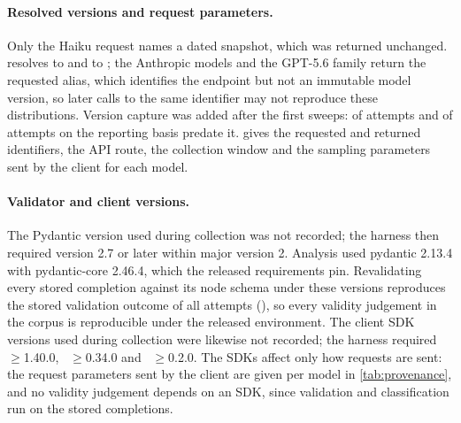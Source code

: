 \paragraph{Resolved versions and request parameters.}
Only the Haiku request names a dated snapshot, which was returned
unchanged.  resolves to  and
 to ; the Anthropic models
and the GPT-5.6 family return the requested alias, which identifies the
endpoint but not an immutable model version, so later calls to the same
identifier may not reproduce these distributions. Version capture was
added after the first sweeps:  of
  attempts and
 of 
 attempts on the reporting basis predate it.
 gives the requested and returned identifiers, the
API route, the collection window and the sampling parameters sent by the
client for each model.

\paragraph{Validator and client versions.}
The Pydantic version used during collection was not recorded; the
harness then required version 2.7 or later within major version 2.
Analysis used pydantic 2.13.4 with pydantic-core 2.46.4, which the
released requirements pin. Revalidating every stored completion against
its node schema under these versions reproduces the stored validation
outcome of all  attempts
(), so every validity judgement in the
corpus is reproducible under the released environment.
The client SDK versions used during collection were likewise not
recorded; the harness required ~$\geq$1.40.0,
~$\geq$0.34.0 and ~$\geq$0.2.0. The
SDKs affect only how requests are sent: the request parameters sent by
the client are given per model in \cref{tab:provenance}, and no validity judgement depends on an
SDK, since validation and classification run on the stored completions.

\begin{table}[htbp]
\centering\scriptsize
\caption{Model provenance. \emph{Returned ID} is the model identifier in
the API response, with attempt counts; \emph{not captured} marks attempts
logged before the response identifier was recorded. Temperature and
 are the values sent by the client.}
\label{tab:provenance}
\resizebox{\linewidth}{!}{}
\end{table}

